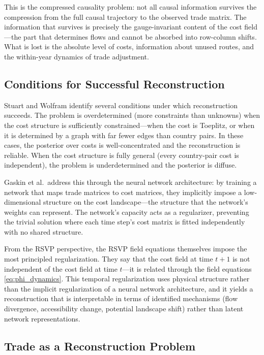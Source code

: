\documentclass[12pt]{article}
\begin{document}
This is the compressed causality problem: not all causal information survives the compression from the full causal trajectory to the observed trade matrix. The information that survives is precisely the gauge-invariant content of the cost field---the part that determines flows and cannot be absorbed into row-column shifts. What is lost is the absolute level of costs, information about unused routes, and the within-year dynamics of trade adjustment.

\subsection{Conditions for Successful Reconstruction}

Stuart and Wolfram identify several conditions under which reconstruction succeeds. The problem is overdetermined (more constraints than unknowns) when the cost structure is sufficiently constrained---when the cost is Toeplitz, or when it is determined by a graph with far fewer edges than country pairs. In these cases, the posterior over costs is well-concentrated and the reconstruction is reliable. When the cost structure is fully general (every country-pair cost is independent), the problem is underdetermined and the posterior is diffuse.

Gaskin et al.\ address this through the neural network architecture: by training a network that maps trade matrices to cost matrices, they implicitly impose a low-dimensional structure on the cost landscape---the structure that the network's weights can represent. The network's capacity acts as a regularizer, preventing the trivial solution where each time step's cost matrix is fitted independently with no shared structure.

From the RSVP perspective, the RSVP field equations themselves impose the most principled regularization. They say that the cost field at time $t+1$ is not independent of the cost field at time $t$---it is related through the field equations \eqref{eq:phi_dynamics}. This temporal regularization uses physical structure rather than the implicit regularization of a neural network architecture, and it yields a reconstruction that is interpretable in terms of identified mechanisms (flow divergence, accessibility change, potential landscape shift) rather than latent network representations.

\subsection{Trade as a Reconstruction Problem}
\end{document}
